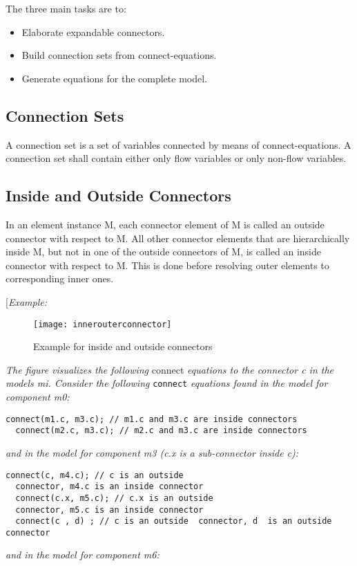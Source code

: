 The three main tasks are to:

\begin{itemize}
\item
  Elaborate expandable connectors.
\item
  Build connection sets from connect-equations.
\item
  Generate equations for the complete model.
\end{itemize}

\subsection{Connection Sets}

A connection set is a set of variables connected by means of
connect-equations. A connection set shall contain either only flow
variables or only non-flow variables.

\subsection{Inside and Outside Connectors}

In an element instance M, each connector element of M is called an
outside connector with respect to M. All other connector elements that
are hierarchically inside M, but not in one of the outside connectors of
M, is called an inside connector with respect to M. This is done before
resolving outer elements to corresponding inner ones.

{[}\emph{Example:}
\begin{figure}[H]
\texttt{[image: innerouterconnector]}
\caption{Example for inside and outside connectors}
\end{figure}
\emph{The figure visualizes the following} connect \emph{equations to
the connector c in the models m\textit{i}. Consider the
following} \lstinline!connect! \emph{equations found in the model for component m0:}

\begin{lstlisting}[language=modelica]
  connect(m1.c, m3.c); // m1.c and m3.c are inside connectors
  connect(m2.c, m3.c); // m2.c and m3.c are inside connectors
\end{lstlisting}
\emph{and in the model for component m3 (c.x is a sub-connector inside
c):}

\begin{lstlisting}[language=modelica]
  connect(c, m4.c); // c is an outside
  connector, m4.c is an inside connector
  connect(c.x, m5.c); // c.x is an outside
  connector, m5.c is an inside connector
  connect(c , d) ; // c is an outside  connector, d  is an outside connector
\end{lstlisting}
\emph{and in the model for component m6:}

